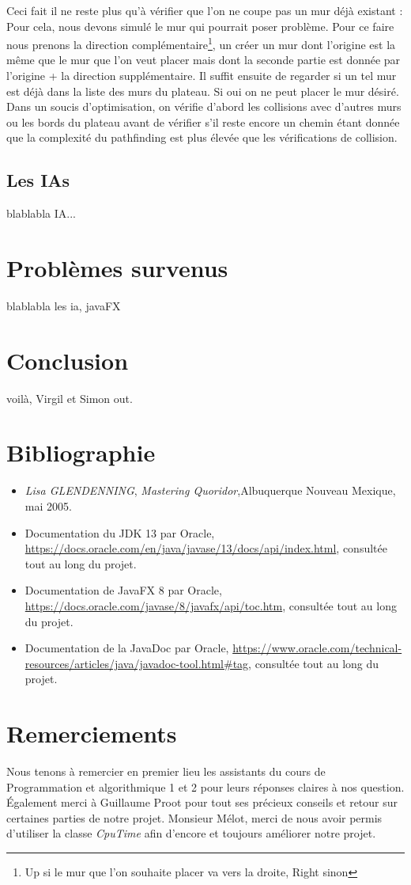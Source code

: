 \documentclass[a4paper, 12pt]{article}
\begin{document}
Ceci fait il ne reste plus qu'à vérifier que l'on ne coupe pas un mur déjà existant : \\
Pour cela, nous devons simulé le mur qui pourrait poser problème. Pour ce faire nous prenons la direction complémentaire\footnote{Up si le mur que l'on souhaite placer va vers la droite, Right sinon}, un créer un mur dont l'origine est la même que le mur que l'on veut placer mais dont la seconde partie est donnée par l'origine + la direction supplémentaire. Il suffit ensuite de regarder si un tel mur est déjà dans la liste des murs du plateau. Si oui on ne peut placer le mur désiré. \\
Dans un soucis d'optimisation, on vérifie d'abord les collisions avec d'autres murs ou les bords du plateau avant de vérifier s'il reste encore un chemin étant donnée que la complexité du pathfinding est plus élevée que les vérifications de collision.

\subsection{Les IAs}
blablabla IA...
\section{Problèmes survenus}
blablabla les ia, javaFX 

\section{Conclusion}

voilà, Virgil et Simon out.

\section{Bibliographie}
\begin{itemize}
\item \emph{Lisa GLENDENNING}, \textit{Mastering Quoridor},Albuquerque Nouveau Mexique, mai 2005.
\item Documentation du JDK 13 par Oracle, \url{https://docs.oracle.com/en/java/javase/13/docs/api/index.html}, consultée tout au long du projet.
\item Documentation de JavaFX 8 par Oracle, \url{https://docs.oracle.com/javase/8/javafx/api/toc.htm}, consultée tout au long du projet.
\item Documentation de la JavaDoc par Oracle, \url{https://www.oracle.com/technical-resources/articles/java/javadoc-tool.html#tag}, consultée tout au long du projet.
\end{itemize}

\section{Remerciements}

Nous tenons à remercier en premier lieu les assistants du cours de Programmation et algorithmique 1 et 2 pour leurs réponses claires à nos question.
Également merci à Guillaume Proot pour tout ses précieux conseils et retour sur certaines parties de notre projet.
Monsieur Mélot, merci de nous avoir permis d'utiliser la classe \textit{CpuTime} afin d'encore et toujours améliorer notre projet.
\end{document}
